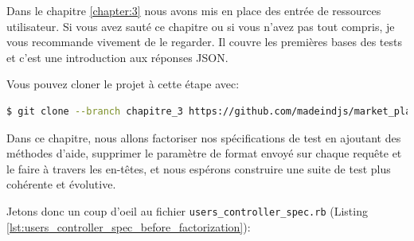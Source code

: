 \documentclass[]{report}
\begin{document}
  Dans le chapitre \ref{chapter:3} nous avons mis en place des entrée de ressources utilisateur. Si vous avez sauté ce chapitre ou si vous n'avez pas tout compris, je vous recommande vivement de le regarder. Il couvre les premières bases des tests et c'est une introduction aux réponses JSON.

  Vous pouvez cloner le projet à cette étape avec:

  \begin{scriptsize}
    \begin{lstlisting}[language=bash]
    $ git clone --branch chapitre_3 https://github.com/madeindjs/market_place_api
    \end{lstlisting}
  \end{scriptsize}

  Dans ce chapitre, nous allons factoriser nos spécifications de test en ajoutant des méthodes d'aide, supprimer le paramètre de format envoyé sur chaque requête et le faire à travers les en-têtes, et nous espérons construire une suite de test plus cohérente et évolutive.

  Jetons donc un coup d'oeil au fichier \verb|users_controller_spec.rb| (Listing \ref{lst:users_controller_spec_before_factorization}):
\end{document}

